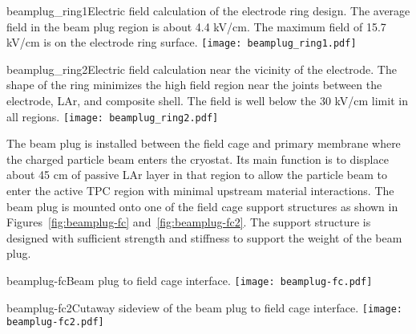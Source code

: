 \begin{cdrfigure}{beamplug_ring1}{Electric field calculation of the electrode ring design. The average field in the beam plug region is about 4.4 kV/cm. The maximum field of 15.7 kV/cm is on the electrode ring surface. }
  \texttt{[image: beamplug\_ring1.pdf]}
\end{cdrfigure}

\begin{cdrfigure}{beamplug_ring2}{Electric field calculation near the vicinity of the electrode. The shape of the ring minimizes the high field region near the joints between the electrode, LAr, and composite shell. The field is well below the 30 kV/cm limit in all regions.}
  \texttt{[image: beamplug\_ring2.pdf]}
\end{cdrfigure}

The beam plug is installed between the field cage and primary membrane where the charged particle beam enters the cryostat. Its main function is to displace about 45 cm of passive LAr layer in that region to allow the particle beam to enter the active TPC region with minimal upstream material interactions. The beam plug is mounted onto one of the field cage support structures as shown in Figures~\ref{fig:beamplug-fc} and~\ref{fig:beamplug-fc2}. The support structure is designed with sufficient  strength and stiffness to support the weight of the beam plug.
\begin{cdrfigure}{beamplug-fc}{Beam plug to field cage interface.}
\texttt{[image: beamplug-fc.pdf]}
\end{cdrfigure}
\begin{cdrfigure}{beamplug-fc2}{Cutaway sideview of the beam plug to field cage interface.}
\texttt{[image: beamplug-fc2.pdf]}
\end{cdrfigure}


